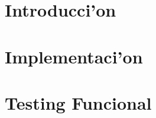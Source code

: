 \documentclass[spanish, a4paper, 10pt, titlepage]{article}
\author{Echevarr'ia - Farjat - Freijo - Giusto}
\begin{document}

\tableofcontents
\clearpage



\section{Introducci'on}

\clearpage

\section{Implementaci'on}

\clearpage

\section{Testing Funcional}

\clearpage

%
\end{document}
